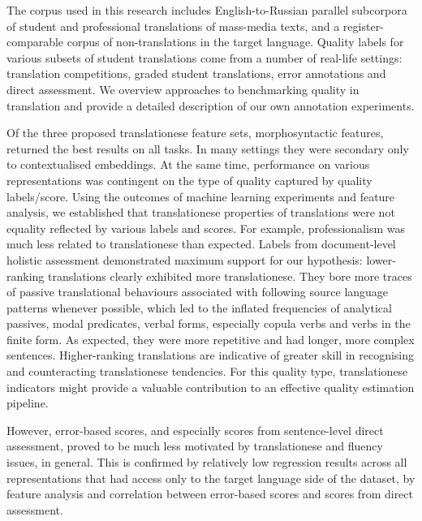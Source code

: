 The corpus used in this research includes English-to-Russian parallel subcorpora of student and professional translations of mass-media texts, and a register-comparable corpus of non-translations in the target language. Quality labels for various subsets of student translations come from a number of real-life settings: translation competitions, graded student translations, error annotations and direct assessment. We overview approaches to benchmarking quality in translation and provide a detailed description of our own annotation experiments. 

Of the three proposed translationese feature sets, morphosyntactic features, returned the best results on all tasks. In many settings they were secondary only to contextualised embeddings. At the same time, performance on various representations was contingent on the type of quality captured by quality labels/score.
Using the outcomes of machine learning experiments and feature analysis, we established that translationese properties of translations were not equality reflected by various labels and scores. For example, professionalism was much less related to translationese than expected. 
Labels from document-level holistic assessment demonstrated maximum support for our hypothesis: lower-ranking translations clearly exhibited more translationese. They bore more traces of passive translational behaviours associated with following source language patterns whenever possible, which led to the inflated frequencies of analytical passives, modal predicates, verbal forms, especially copula verbs and verbs in the finite form. As expected, they were more repetitive and had longer, more complex sentences. Higher-ranking translations are indicative of greater skill in recognising and counteracting translationese tendencies. For this quality type, translationese indicators might provide a valuable contribution to an effective quality estimation pipeline. 

However, error-based scores, and especially scores from sentence-level direct assessment, proved to be much less motivated by translationese and fluency issues, in general. This is confirmed by relatively low regression results across all representations that had access only to the target language side of the dataset, by feature analysis and correlation between error-based scores and scores from direct assessment.
